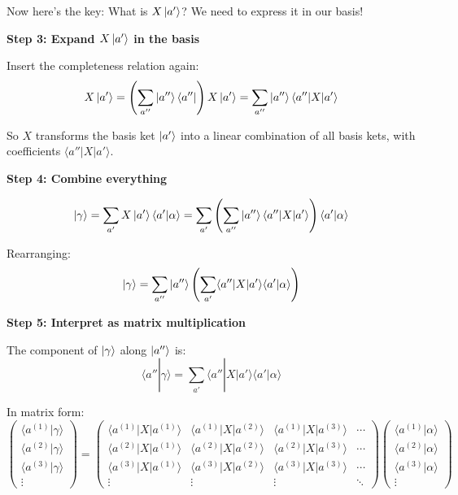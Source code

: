 \documentclass[11pt,a4paper]{article}
\begin{document}
Now here's the key: What is $X\ket{a'}$? We need to express it in our basis!

\textbf{Step 3: Expand $X\ket{a'}$ in the basis}

Insert the completeness relation again:
$$X\ket{a'} = \left(\sum_{a''}\ket{a''}\langle a''|\right)X\ket{a'} = \sum_{a''}\ket{a''}\langle a''|X|a'\rangle$$

So $X$ transforms the basis ket $\ket{a'}$ into a linear combination of all basis kets, with coefficients $\langle a''|X|a'\rangle$.

\textbf{Step 4: Combine everything}

$$\ket{\gamma} = \sum_{a'}X\ket{a'}\langle a'|\alpha\rangle = \sum_{a'}\left(\sum_{a''}\ket{a''}\langle a''|X|a'\rangle\right)\langle a'|\alpha\rangle$$

Rearranging:
$$\ket{\gamma} = \sum_{a''}\ket{a''}\left(\sum_{a'}\langle a''|X|a'\rangle\langle a'|\alpha\rangle\right)$$

\textbf{Step 5: Interpret as matrix multiplication}

The component of $\ket{\gamma}$ along $\ket{a''}$ is:
$$\langle a''|\gamma\rangle = \sum_{a'}\langle a''|X|a'\rangle\langle a'|\alpha\rangle$$

In matrix form:
$$\begin{pmatrix}
\langle a^{(1)}|\gamma\rangle \\
\langle a^{(2)}|\gamma\rangle \\
\langle a^{(3)}|\gamma\rangle \\
\vdots
\end{pmatrix} = \begin{pmatrix}
\langle a^{(1)}|X|a^{(1)}\rangle & \langle a^{(1)}|X|a^{(2)}\rangle & \langle a^{(1)}|X|a^{(3)}\rangle & \cdots \\
\langle a^{(2)}|X|a^{(1)}\rangle & \langle a^{(2)}|X|a^{(2)}\rangle & \langle a^{(2)}|X|a^{(3)}\rangle & \cdots \\
\langle a^{(3)}|X|a^{(1)}\rangle & \langle a^{(3)}|X|a^{(2)}\rangle & \langle a^{(3)}|X|a^{(3)}\rangle & \cdots \\
\vdots & \vdots & \vdots & \ddots
\end{pmatrix} \begin{pmatrix}
\langle a^{(1)}|\alpha\rangle \\
\langle a^{(2)}|\alpha\rangle \\
\langle a^{(3)}|\alpha\rangle \\
\vdots
\end{pmatrix}$$
\end{document}
